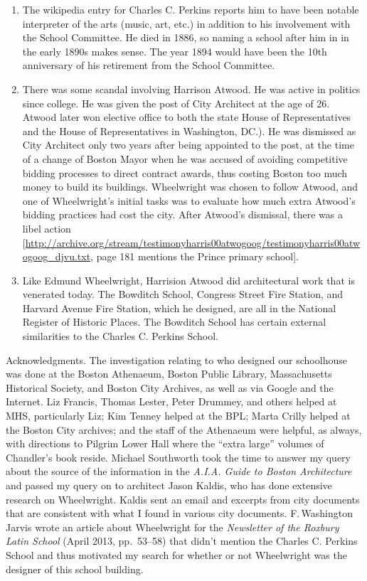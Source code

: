 \documentclass{article}
\begin{document}
\begin{enumerate}
\item The wikipedia entry for Charles C. Perkins reports him to have been notable
interpreter of the arts (music, art, etc.) in addition to his involvement with the School
Committee.  He died in 1886, so naming a school after him in in the early 1890s makes
sense.  The year 1894 would have been the 10th anniversary of his retirement from the
School Committee.

\item There was some scandal involving Harrison Atwood.  He was active in politics
since college. He was given the post of City Architect at the age of 26.  Atwood later
won elective office to both the state House of Representatives and the House of
Representatives in Washington, DC.).  He was dismissed as City Architect only two years
after being appointed to the post, at the time of a change of Boston Mayor when he was
accused of avoiding competitive bidding processes to direct contract awards, thus costing
Boston too much money to build its buildings.  Wheelwright was chosen to follow Atwood,
and one of Wheelwright's initial tasks was to evaluate how much extra Atwood's bidding
practices had cost the city. After Atwood's dismissal, there was a libel action
[\url{http://archive.org/stream/testimonyharris00atwogoog/testimonyharris00atwogoog_djvu.txt},
page 181 mentions the Prince primary school].

\item Like Edmund Wheelwright, Harrision Atwood did architectural work that
is venerated today.  The Bowditch School, Congress Street Fire Station, and Harvard
Avenue Fire Station, which he designed, are all in the National Register of Historic
Places. The Bowditch School has certain external similarities to the Charles C. Perkins
School.

\end{enumerate}
\bigskip
\noindent Acknowledgments.  The investigation relating to who designed our schoolhouse
was done at the Boston Athenaeum, Boston Public Library, Massachusetts Historical
Society, and Boston City Archives, as well as via Google and the Internet.  Liz Francis,
Thomas Lester, Peter Drummey, and others helped at MHS, particularly Liz; Kim Tenney
helped at the BPL; Marta Crilly helped at the Boston City archives; and the staff of the
Athenaeum were helpful, as always, with directions to Pilgrim Lower Hall where the
``extra large'' volumes of Chandler's book reside. Michael Southworth took the time to
answer my query about the source of the information in the \textit{A.I.A. Guide to Boston
Architecture} and passed my query on to architect Jason Kaldis, who has done extensive
research on Wheelwright.  Kaldis sent an email and excerpts from city documents that are
consistent with what I found in various city documents.  F.\,Washington Jarvis wrote an
article about Wheelwright for the \textit{Newsletter of the Roxbury Latin School} (April
2013, pp.~53--58) that didn't mention the Charles C. Perkins School and thus motivated my
search for whether or not Wheelwright was the designer of this school building.
\end{document}

